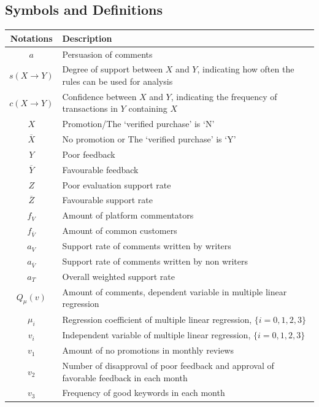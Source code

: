 \documentclass[11pt,a4]{article}
\begin{document}
\subsection{Symbols and Definitions}

\begin{table}[h]
\renewcommand{\arraystretch}{1.2}
\begin{center}
{\footnotesize
\begin{tabular}{c l}
\toprule
{Notations} & {Description} \\
\midrule
$a$    & {Persuasion of comments} \\
$s(X\rightarrow Y)$  &  {Degree of support between $X$ and $Y$,  indicating how often the rules can be used for analysis}\\
$c(X\rightarrow Y)$  &  {Confidence between $X$ and $Y$, indicating the frequency of transactions in $Y$ containing $X$} \\
$X$ & {Promotion/The `verified purchase' is `N'} \\
$\overline{X}$ & {No promotion or The `verified purchase' is `Y'} \\
$Y$ & {Poor feedback} \\
$\overline{Y}$ & {Favourable feedback} \\
$Z$ & {Poor evaluation support rate} \\
$\overline{Z}$ & {Favourable support rate} \\
$f_{V}$ & {Amount of platform commentators} \\
$f_{\overline{V}}$ & {Amount of common customers} \\
$a_{V}$ & {Support rate of comments written by writers} \\
$a_{\overline{V}}$ & {Support rate of comments written by non writers} \\
$a_{T}$ & {Overall weighted support rate} \\
$Q_\mu(v)$ & {Amount of comments, dependent variable in multiple linear regression} \\
$\mu_i$ & {Regression coefficient of multiple linear regression, $\lbrace i=0, 1, 2, 3 \rbrace$} \\
$v_i$ & {Independent variable of multiple linear regression, $\lbrace i=0, 1, 2, 3 \rbrace$} \\
$v_1$ & {Amount of no promotions in monthly reviews} \\
$v_2$ & {Number of disapproval of poor feedback and approval of favorable feedback in each month} \\
$v_3$ & {Frequency of good keywords in each month} \\

\end{tabular}}
\end{center}
\end{table}
\end{document}
